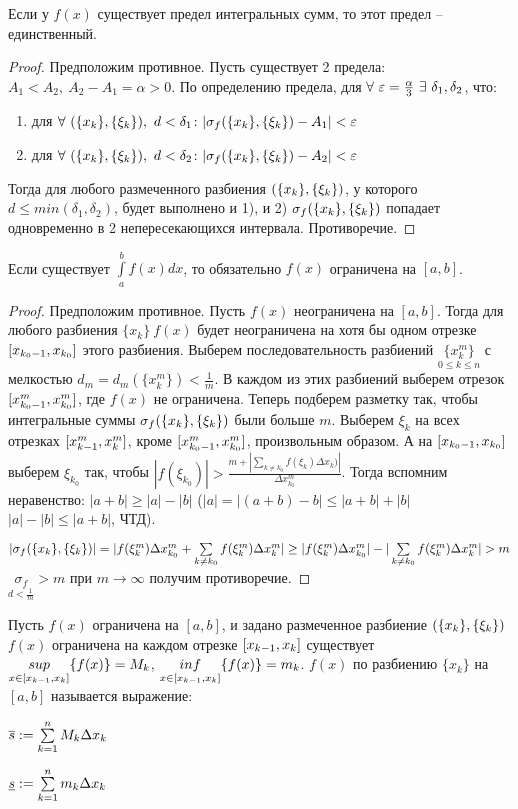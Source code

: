\begin{theor}
Если у $f(x)$ существует предел интегральных сумм, то этот предел -- единственный.
\end{theor}
\begin{proof}
Предположим противное. Пусть существует 2 предела: $A_1<A_2,\ A_2-A_1=\alpha>0$.
По определению предела, для $\forall\ \eps=\frac\alpha3\ \exists\ \delta_1,\delta_2$, что:
\begin{enumerate}
\item для $\forall\ \rr,\ d<\delta_1\colon|\sigma_f\rr-A_1|<\eps$
\item для $\forall\ \rr,\ d<\delta_2\colon|\sigma_f\rr-A_2|<\eps$
\end{enumerate}
Тогда для любого размеченного разбиения $(\{x_k\},\{\xi_k\})$, у которого $d\leq min(\delta_1,\delta_2)$, будет выполнено и 1), и 2) \then $\sigma_f(\{x_k\},\{\xi_k\})$ попадает одновременно в 2 непересекающихся интервала. Противоречие.
\end{proof}
\begin{theor}
Если существует $\int\limits_a^bf(x)dx$, то обязательно $f(x)$ ограничена на $[a,b]$.
\end{theor}
\begin{proof}
Предположим противное. Пусть $f(x)$ неограничена на $[a,b]$. Тогда для любого разбиения $\{x_k\}\ f(x)$ будет неограничена на хотя бы одном отрезке $[x_{k_0-1},x_{k_0}]$ этого разбиения. Выберем последовательность разбиений $\underset{0\leq k\leq n}{\{x_k^m\}}$ с мелкостью $d_m=d_m(\{x_k^m\})<\frac1m$. В каждом из этих разбиений выберем отрезок $[x^m_{k_0-1},x^m_{k_0}]$, где $f(x)$ не ограничена. Теперь подберем разметку так, чтобы интегральные суммы $\sigma_f(\{x_k\},\{\xi_k\})$ были больше $m$. Выберем $\xi_k$ на всех отрезках $[x^m_{k-1},x^m_k]$, кроме $[x^m_{k_0-1},x^m_{k_0}]$, произвольным образом. А на $[x_{k_0-1},x_{k_0}]$ выберем $\xi_{k_0}$ так, чтобы $|f(\xi_{k_0})|>\frac{m+|\sum\limits_{k\neq k_0}f(\xi_k)\Delta x_k)|}{\Delta x^m_{k_0}}$.
Тогда вспомним неравенство: $|a+b|\geq|a|-|b|$ ($|a|=|(a+b)-b|\leq|a+b|+|b|$ \then $|a|-|b|\leq|a+b|$, ЧТД).

$|\sigma_f\rr|=|f(\xi_k^m)\Delta x_{k_0}^m+\sum\limits_{k\neq k_0}f(\xi^m_k)\Delta x^m_k|\geq|f(\xi_k^m)\Delta x_{k_0}^m|-|\sum\limits_{k\neq k_0}f(\xi^m_k)\Delta x^m_k|>m$ \then $\underset{d<\frac1m}{\sigma_f}>m$ \then при $m\to\infty$ получим противоречие.
\end{proof}
\begin{opred}
Пусть $f(x)$ ограничена на $[a,b]$, и задано размеченное разбиение $(\{x_k\},\{\xi_k\})$ \then $f(x)$ ограничена на каждом отрезке $[x_{k-1},x_k]$ \then  существует $\underset{x\in[x_{k-1},x_k]}{sup}\{f(x)\}=M_k$, $\underset{x\in[x_{k-1},x_k]}{inf}\{f(x)\}=m_k$.  $f(x)$ по разбиению $\{x_k\}$ на $[a,b]$  называется выражение:

$\overline{s}:=\sum\limits_{k=1}^nM_k\Delta x_k$

$\underline{s}:=\sum\limits_{k=1}^nm_k\Delta x_k$
\end{opred}

